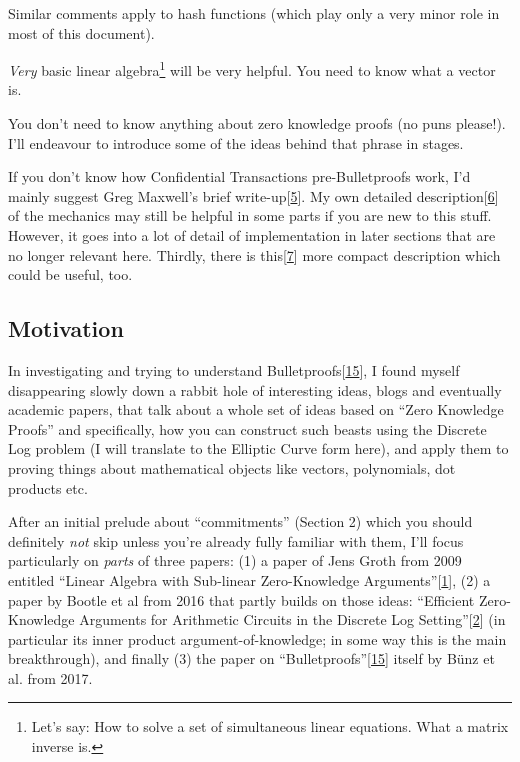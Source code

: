 \documentclass[10pt,a4paper]{article}
\begin{document}
Similar comments apply to hash functions (which play only a very minor
role in most of this document).

\emph{Very} basic linear algebra\footnote{Let's say: How to solve a set of
simultaneous linear equations. What a matrix inverse is.} will be very
helpful. You need to know what a vector is.

You don't need to know anything about zero knowledge proofs (no puns
please!). I'll endeavour to introduce some of the ideas behind that
phrase in stages.

If you don't know how Confidential Transactions pre-Bulletproofs work,
I'd mainly suggest Greg Maxwell's brief write-up{[}\protect\hyperlink{anchor-2}{5}{]}. 
My own detailed description{[}\protect\hyperlink{anchor-3}{6}{]} of the mechanics may
still be helpful in some parts if you are new to this stuff. However, it goes
into a lot of detail of implementation in later sections that are no
longer relevant here. Thirdly, there is
this{[}\protect\hyperlink{anchor-4}{7}{]} more compact description which
could be useful, too.

\hypertarget{motivation}{%
\subsection[Motivation]{\texorpdfstring{\protect\hypertarget{anchor-5}{}{}Motivation}{Motivation}}\label{motivation}}

In investigating and trying to understand
Bulletproofs{[}\protect\hyperlink{anchor-6}{15}{]}, I found myself
disappearing slowly down a rabbit hole of interesting ideas, blogs and
eventually academic papers, that talk about a whole set of ideas based
on ``Zero Knowledge Proofs'' and specifically, how you can construct
such beasts using the Discrete Log problem (I will translate to the
Elliptic Curve form here), and apply them to proving things about
mathematical objects like vectors, polynomials, dot products etc.

After an initial prelude about ``commitments'' (Section 2) which you
should definitely \emph{not} skip unless you're already fully familiar
with them, I'll focus particularly on \emph{parts} of three papers: (1)
a paper of Jens Groth from 2009 entitled ``Linear Algebra with
Sub-linear Zero-Knowledge
Arguments''{[}\protect\hyperlink{anchor-7}{1}{]}, (2) a paper by Bootle
et al from 2016 that partly builds on those ideas: ``Efficient
Zero-Knowledge Arguments for Arithmetic Circuits in the Discrete Log
Setting''{[}\protect\hyperlink{anchor-8}{2}{]} (in particular its inner
product argument-of-knowledge; in some way this is the main
breakthrough), and finally (3) the paper on
``Bulletproofs''{[}\protect\hyperlink{anchor-6}{15}{]} itself by Bünz et
al. from 2017.
\end{document}
